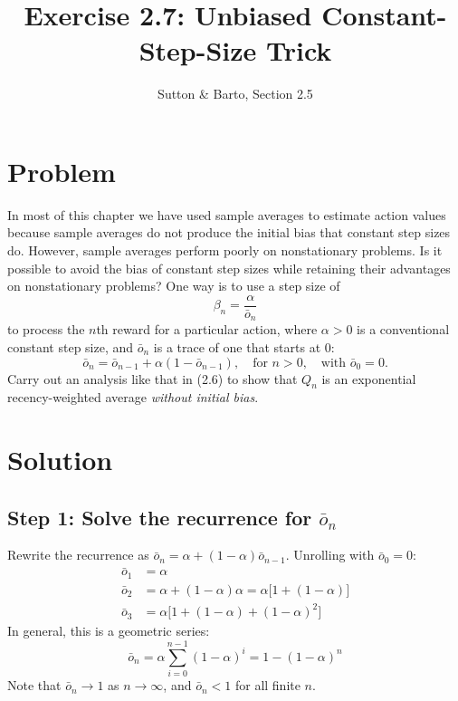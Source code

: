 \documentclass[11pt]{article}
\title{Exercise 2.7: Unbiased Constant-Step-Size Trick}
\author{Sutton \& Barto, Section 2.5}
\date{}
\begin{document}
\maketitle

\section*{Problem}

In most of this chapter we have used sample averages to estimate action values because
sample averages do not produce the initial bias that constant step sizes do.
However, sample averages perform poorly on nonstationary problems.
Is it possible to avoid the bias of constant step sizes while retaining their advantages
on nonstationary problems? One way is to use a step size of
\begin{equation}
    \beta_n = \frac{\alpha}{\bar{o}_n} \tag{2.8}
\end{equation}
to process the $n$th reward for a particular action, where $\alpha > 0$ is a conventional
constant step size, and $\bar{o}_n$ is a trace of one that starts at 0:
\begin{equation}
    \bar{o}_n = \bar{o}_{n-1} + \alpha(1 - \bar{o}_{n-1}), \quad
    \text{for } n > 0, \quad \text{with } \bar{o}_0 = 0. \tag{2.9}
\end{equation}
Carry out an analysis like that in (2.6) to show that $Q_n$ is an exponential
recency-weighted average \emph{without initial bias}.

\section*{Solution}

\subsection*{Step 1: Solve the recurrence for $\bar{o}_n$}

Rewrite the recurrence as $\bar{o}_n = \alpha + (1-\alpha)\bar{o}_{n-1}$.
Unrolling with $\bar{o}_0 = 0$:
\begin{align*}
    \bar{o}_1 &= \alpha \\
    \bar{o}_2 &= \alpha + (1-\alpha)\alpha = \alpha\bigl[1 + (1-\alpha)\bigr] \\
    \bar{o}_3 &= \alpha\bigl[1 + (1-\alpha) + (1-\alpha)^2\bigr]
\end{align*}
In general, this is a geometric series:
\[
    \boxed{\bar{o}_n = \alpha \sum_{i=0}^{n-1}(1-\alpha)^i = 1 - (1-\alpha)^n}
\]
Note that $\bar{o}_n \to 1$ as $n \to \infty$, and $\bar{o}_n < 1$ for all finite $n$.
\end{document}
